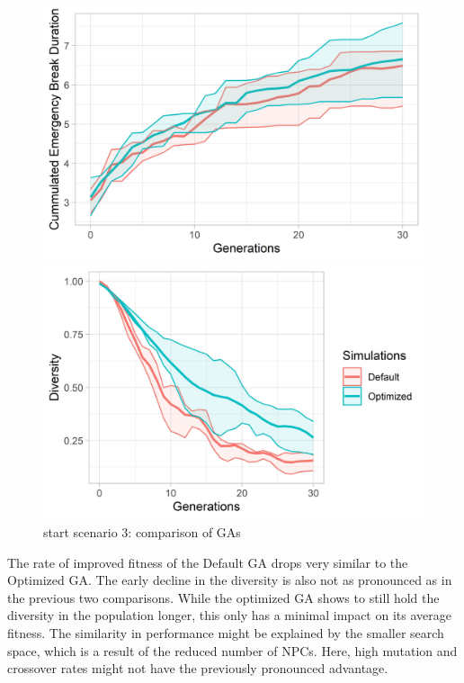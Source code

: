 \begin{figure}[ht] 
	\begin{minipage}[b]{0.5\linewidth}
		\centering
		\includegraphics[width=1\linewidth]{simulations/evaluation/plots/sim_3_ga_generations} 
	\end{minipage}%
	\begin{minipage}[b]{0.5\linewidth}
		\centering
		\includegraphics[width=1\linewidth]{simulations/evaluation/plots/sim_3_ga_diversity} 
	\end{minipage} 
	\caption{start scenario 3: comparison of GAs}
	\label{fig:evaluation:sim_3_ga_comparison}
\end{figure}


The rate of improved fitness of the Default GA drops very similar to the Optimized GA. The early decline in the diversity is also not as pronounced as in the previous two comparisons. While the optimized GA shows to still hold the diversity in the population longer, this only has a minimal impact on its average fitness. The similarity in performance might be explained by the smaller search space, which is a result of the reduced number of NPCs. Here, high mutation and crossover rates might not have the previously pronounced advantage.

